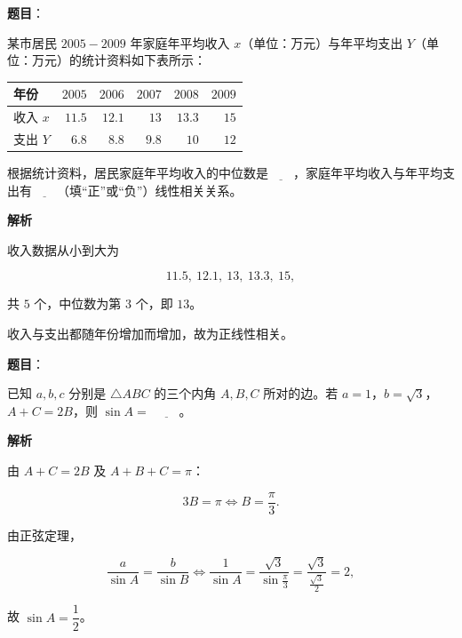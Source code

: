 \begin{answer}

\textbf{题目}：

某市居民 $2005-2009$ 年家庭年平均收入 $x$（单位：万元）与年平均支出 $Y$（单位：万元）的统计资料如下表所示：

\begin{center}
\begin{tabular}{lrrrrr}
\toprule
年份 & $2005$ & $2006$ & $2007$ & $2008$ & $2009$ \\
\midrule
收入 $x$ & $11.5$ & $12.1$ & $13$ & $13.3$ & $15$ \\
支出 $Y$ & $6.8$ & $8.8$ & $9.8$ & $10$ & $12$ \\
\bottomrule
\end{tabular}
\end{center}

根据统计资料，居民家庭年平均收入的中位数是$\underline{\qquad}$，家庭年平均收入与年平均支出有$\underline{\qquad}$（填“正”或“负”）线性相关关系。

\textbf{解析}

收入数据从小到大为

\nopagebreak[4]
\[11.5,\ 12.1,\ 13,\ 13.3,\ 15,\]

共 $5$ 个，中位数为第 $3$ 个，即 $13$。

收入与支出都随年份增加而增加，故为正线性相关。


\end{answer}
\begin{answer}

\textbf{题目}：

已知 $a,b,c$ 分别是 $\triangle ABC$ 的三个内角 $A,B,C$ 所对的边。若 $a=1$，$b=\sqrt3$，$A+C=2B$，则 $\sin A=$ $\underline{\qquad}$。

\textbf{解析}

由 $A+C=2B$ 及 $A+B+C=\pi$：

\nopagebreak[4]
\[3B=\pi\iff B=\frac\pi3.\]

由正弦定理，

\nopagebreak[4]
\[\frac a{\sin A}=\frac b{\sin B}
\iff \frac1{\sin A}=\frac{\sqrt3}{\sin\frac\pi3}=\frac{\sqrt3}{\frac{\sqrt3}2}=2,\]

故 $\sin A=\dfrac12$。


\end{answer}
